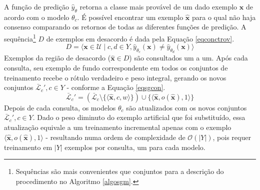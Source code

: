 A função de predição $\hat{y}_{\theta}$ retorna a classe mais provável de um dado exemplo $\bm{x}$ de acordo com o modelo $\theta_c$.
É possível encontrar um exemplo $\bm{\hat{x}}$ para o qual não haja consenso comparando os retornos de todas as diferentes funções de predição.
A sequência\footnote{Sequências são mais convenientes que conjuntos para a descrição do procedimento no Algoritmo \ref{algosgm}.} $D$ de exemplos em desacordo é dada pela Equação \ref{eqconctrov}.
\begin{equation}\label{eqconctrov}
D = \langle\bm{x} \in \mathcal{U} \mid c,d \in Y, \hat{y}_{\theta_c}(\bm{x}) \neq \hat{y}_{\theta_d}(\bm{x})\rangle
\end{equation}
Exemplos da região de desacordo ($\bm{\hat{x}} \in D$) são consultados um a um.
Após cada consulta, seu exemplo de fundo correspondente em todos os conjuntos de treinamento recebe o rótulo verdadeiro e peso integral, gerando os novos conjuntos $\mathcal{\bar{L}}_c', c \in Y$ - conforme a Equação \ref{eqsgcon}.
\begin{equation}\label{eqsgcon}
\mathcal{\bar{L}}_c' = (\mathcal{\bar{L}}_c \setminus \{\langle\bm{\hat{x}},c,w\rangle\}) \cup
\{\langle\bm{\hat{x}},o(\bm{\hat{x}}),1\rangle\}
\end{equation}
Depois de cada consulta, os modelos $\theta_c$ são atualizados com os novos conjuntos $\mathcal{\bar{L}}_c', c \in Y$.
Dado o peso diminuto do exemplo artificial que foi substituído, essa atualização equivale a um treinamento incremental apenas com o exemplo $\langle\bm{\hat{x}},o(\bm{\hat{x}}),1\rangle$ - resultando numa ordem de complexidade de $\mathcal{O}(|Y|)$, pois requer treinamento em $|Y|$ exemplos por consulta, um para cada modelo.

